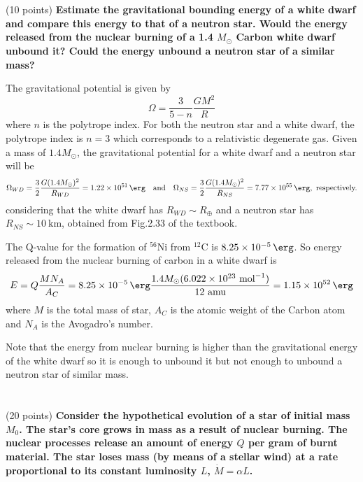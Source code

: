 \section{}(10 points)
\textbf{Estimate the gravitational bounding energy of a white dwarf and compare this energy to that of a neutron star. Would the energy released from the nuclear burning of a 1.4 $M_\odot$ Carbon white dwarf unbound it? Could the energy unbound a neutron star
of a similar mass?}

The gravitational potential is given by
\begin{equation*}
    \Omega = \frac{3}{5-n}\frac{GM^2}{R}
\end{equation*}
where $n$ is the polytrope index. For both the neutron star and a white dwarf, the polytrope index is $n=3$  which corresponds to a relativistic degenerate gas. Given a mass of $1.4M_\odot$, the gravitational potential for a white dwarf and a neutron star will be 
\begin{equation*}
    \Omega_{WD}=\frac{3}{2}\frac{G(1.4M_\odot)^2}{R_{WD}}=\SI{1.22e+51}{\erg} \quad\text{and}\quad \Omega_{NS}=\frac{3}{2}\frac{G(1.4M_\odot)^2}{R_{NS}} =\SI{7.77e+55}{\erg} , \text{ respectively.}
\end{equation*}
considering that the white dwarf has $R_{WD}\sim R_\oplus$ and a neutron star has $R_{NS} \sim \SI{10}{\km}$, obtained from Fig.2.33 of the textbook.

The Q-value for the formation of ${}^{56}\mathrm{Ni}$ from ${}^{12}\mathrm{C}$ is $\SI{8.25e-5}{\erg}$. So energy released from the nuclear burning of carbon in a white dwarf is
\begin{equation*}
    E = Q\frac{M N_A}{A_C} = \SI{8.25e-5}{\erg}\frac{1.4M_\odot( \num{6.022e23}\text{ mol}^{-1})}{12 \text{ amu}} = \SI{1.15e+52}{\erg}
\end{equation*}
where $M$ is the total mass of star, $A_C$ is the atomic weight of the Carbon atom and $N_A$ is the Avogadro's number.

Note that the energy from nuclear burning is higher than the gravitational energy of the white dwarf so it is enough to unbound it but not enough to unbound a neutron star of similar mass.


\section{}(20 points)
\textbf{Consider the hypothetical evolution of a star of initial mass $M_0$.
The star's core grows in mass as a result of nuclear burning.
The nuclear processes release an amount of energy $Q$ per gram of burnt material. 
The star loses mass (by means of a stellar wind) at a rate proportional to its constant luminosity $L$, $\Dot{M} = \alpha L$.}
